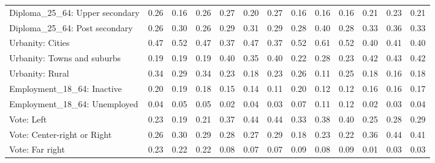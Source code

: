 \begin{tabular}[t]{lllllllllllll}
Diploma\_25\_64: Upper secondary & 0.26 & 0.16 & 0.26 & 0.27 & 0.20 & 0.27 & 0.16 & 0.16 & 0.16 & 0.21 & 0.23 & 0.21\\
Diploma\_25\_64: Post secondary & 0.26 & 0.30 & 0.26 & 0.29 & 0.31 & 0.29 & 0.28 & 0.40 & 0.28 & 0.33 & 0.36 & 0.33\\
\addlinespace
Urbanity: Cities & 0.47 & 0.52 & 0.47 & 0.37 & 0.47 & 0.37 & 0.52 & 0.61 & 0.52 & 0.40 & 0.41 & 0.40\\
Urbanity: Towns and suburbs & 0.19 & 0.19 & 0.19 & 0.40 & 0.35 & 0.40 & 0.22 & 0.28 & 0.23 & 0.42 & 0.43 & 0.42\\
Urbanity: Rural & 0.34 & 0.29 & 0.34 & 0.23 & 0.18 & 0.23 & 0.26 & 0.11 & 0.25 & 0.18 & 0.16 & 0.18\\
\addlinespace
Employment\_18\_64: Inactive & 0.20 & 0.19 & 0.18 & 0.15 & 0.14 & 0.11 & 0.20 & 0.12 & 0.12 & 0.16 & 0.16 & 0.17\\
Employment\_18\_64: Unemployed & 0.04 & 0.05 & 0.05 & 0.02 & 0.04 & 0.03 & 0.07 & 0.11 & 0.12 & 0.02 & 0.03 & 0.04\\
\addlinespace
Vote: Left & 0.23 & 0.19 & 0.21 & 0.37 & 0.44 & 0.44 & 0.33 & 0.38 & 0.40 & 0.25 & 0.28 & 0.29\\
Vote: Center-right or Right & 0.26 & 0.30 & 0.29 & 0.28 & 0.27 & 0.29 & 0.18 & 0.23 & 0.22 & 0.36 & 0.44 & 0.41\\
Vote: Far right & 0.23 & 0.22 & 0.22 & 0.08 & 0.07 & 0.07 & 0.09 & 0.08 & 0.09 & 0.01 & 0.03 & 0.03\\
\bottomrule
\end{tabular}